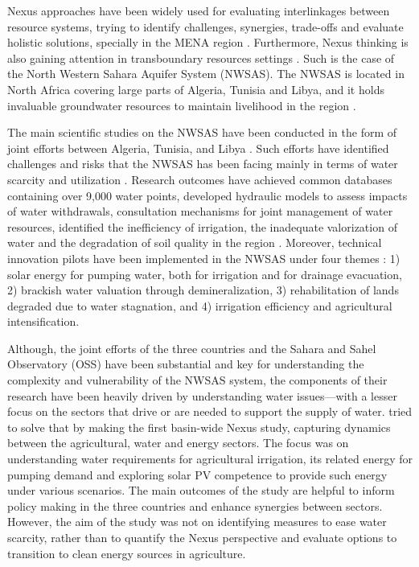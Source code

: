 Nexus approaches have been widely used for evaluating interlinkages between resource systems, trying to identify challenges, synergies, trade-offs and evaluate holistic solutions, specially in the MENA region \cite{hoffNexusApproachMENA2019,kingRapidAssessmentWater2015}. Furthermore, Nexus thinking is also gaining attention in transboundary resources settings \cite{uneceReconcilingResourceUses2015,kingRapidAssessmentWater2015}. Such is the case of the North Western Sahara Aquifer System (NWSAS). The NWSAS is located in North Africa covering large parts of Algeria, Tunisia and Libya, and it holds invaluable groundwater resources to maintain livelihood in the region \cite{BetterValorizationIrrigation2015}.

The main scientific studies on the NWSAS have been conducted in the form of joint efforts between Algeria, Tunisia, and Libya \cite{abuzeidNorthWesternSahara2015}. Such efforts have identified challenges and risks that the NWSAS has been facing mainly in terms of water scarcity and utilization \cite{BetterValorizationIrrigation2015}. Research outcomes have achieved common databases containing over 9,000 water points, developed hydraulic models to assess impacts of water withdrawals, consultation mechanisms for joint management of water resources, 
identified the inefficiency of irrigation, the inadequate valorization of water and the degradation of soil quality in the region \cite{khaterNorthWesternSahara2014,abuzeidNorthWesternSahara2015,BetterValorizationIrrigation2015,Socioeconomicaspectsirrigation2014}. Moreover, technical innovation pilots have been implemented in the NWSAS under four themes \cite{ossAgriculturalDemostrationPilots2014}: 1) solar energy for pumping water, both for irrigation and for drainage evacuation, 2) brackish water valuation through demineralization, 3) rehabilitation of lands degraded due to water stagnation, and 4) irrigation efficiency and agricultural intensification. 

Although, the joint efforts of the three countries and the Sahara and Sahel Observatory (OSS) have been substantial and key for understanding the complexity and vulnerability of the NWSAS system, the components of their research have been heavily driven by understanding water issues---with a lesser focus on the sectors that drive or are needed to support the supply of water. \citet{almullaNWSAS} tried to solve that by making the first basin-wide Nexus study, capturing dynamics between the agricultural, water and energy sectors. The focus was on understanding water requirements for agricultural irrigation, its related energy for pumping demand and exploring solar PV competence to provide such energy under various scenarios. The main outcomes of the study are helpful to inform policy making in the three countries and enhance synergies between sectors. However, the aim of the study was not on identifying measures to ease water scarcity, rather than to quantify the Nexus perspective and evaluate options to transition to clean energy sources in agriculture.

